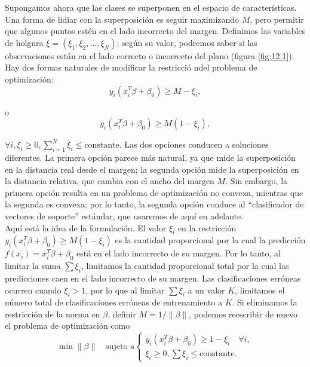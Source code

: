 Supongamos ahora que las clases se superponen en el espacio de características. Una forma de lidiar con la superposición es seguir maximizando $M$, pero permitir que algunos puntos estén en el lado incorrecto del margen. Definimos las variables de holgura $\xi = (\xi_1, \xi_2, \ldots, \xi_N)$; según su valor, podremos saber si las observaciones están en el lado correcto o incorrecto del plano (figura \ref{fig:12.1}). Hay dos formas naturales de modificar la restricció ndel problema de optimización:
\begin{equation}
y_i (x_i^T \beta + \beta_0) \geq M - \xi_i,
\end{equation}

\noindent o
\begin{equation}
y_i (x_i^T \beta + \beta_0) \geq M (1 - \xi_i),
\end{equation}

$\forall i, \xi_i \geq 0, \sum_{i=1}^N \xi_i \leq \text{constante}$. Las dos opciones conducen a soluciones diferentes. La primera opción parece más natural, ya que mide la superposición en la distancia real desde el margen; la segunda opción mide la superposición en la distancia relativa, que cambia con el ancho del margen $M$. Sin embargo, la primera opción resulta en un problema de optimización no convexa, mientras que la segunda es convexa; por lo tanto, la segunda opción conduce al ``clasificador de vectores de soporte'' estándar, que usaremos de aquí en adelante. \\

Aquí está la idea de la formulación. El valor $\xi_i$ en la restricción $y_i (x_i^T \beta + \beta_0) \geq M (1 - \xi_i)$ es la cantidad proporcional por la cual la predicción $f(x_i) = x_i^T \beta + \beta_0$ está en el lado incorrecto de su margen. Por lo tanto, al limitar la suma $\sum \xi_i$, limitamos la cantidad proporcional total por la cual las predicciones caen en el lado incorrecto de su margen. Las clasificaciones erróneas ocurren cuando $\xi_i > 1$, por lo que al limitar $\sum \xi_i$ a un valor $K$, limitamos el número total de clasificaciones erróneas de entrenamiento a $K$.
Si eliminamos la restricción de la norma en $\beta$, definir $M = 1/\|\beta\|$, podemos reescribir de nuevo el problema de optimización como 
\begin{equation}
\min \|\beta\| \quad \text{sujeto a}
\begin{cases}
y_i (x_i^T \beta + \beta_0) \geq 1 - \xi_i \quad \forall i, \\
\xi_i \geq 0, \sum \xi_i \leq \text{constante}.
\end{cases}
\label{eq:12.7}
\end{equation}

